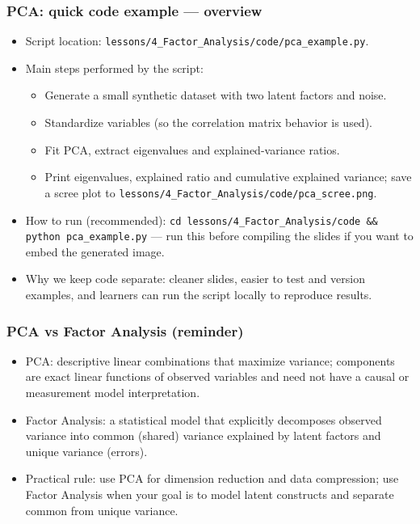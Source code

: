 \documentclass[aspectratio=169]{beamer}
\begin{document}
\begin{frame}
\frametitle{PCA: quick code example — overview}
\begin{itemize}
    \item Script location: \texttt{lessons/4\_Factor\_Analysis/code/pca\_example.py}. \pause
    \item Main steps performed by the script: \pause
    \begin{itemize}
        \item Generate a small synthetic dataset with two latent factors and noise. \pause
        \item Standardize variables (so the correlation matrix behavior is used). \pause
        \item Fit PCA, extract eigenvalues and explained-variance ratios. \pause
        \item Print eigenvalues, explained ratio and cumulative explained variance; save a scree plot to \texttt{lessons/4\_Factor\_Analysis/code/pca\_scree.png}. \pause
    \end{itemize}
    \item How to run (recommended): \texttt{cd lessons/4\_Factor\_Analysis/code \&\& python pca\_example.py} — run this before compiling the slides if you want to embed the generated image. \pause
    \item Why we keep code separate: cleaner slides, easier to test and version examples, and learners can run the script locally to reproduce results.\pause
\end{itemize}
\vspace{6pt}
\end{frame}

\begin{frame}
\frametitle{PCA vs Factor Analysis (reminder)}
\begin{itemize}
    \item PCA: descriptive linear combinations that maximize variance; components are exact linear functions of observed variables and need not have a causal or measurement model interpretation. \pause
    \item Factor Analysis: a statistical model that explicitly decomposes observed variance into common (shared) variance explained by latent factors and unique variance (errors). \pause
    \item Practical rule: use PCA for dimension reduction and data compression; use Factor Analysis when your goal is to model latent constructs and separate common from unique variance. \pause
\end{itemize}
\end{frame}
\end{document}
